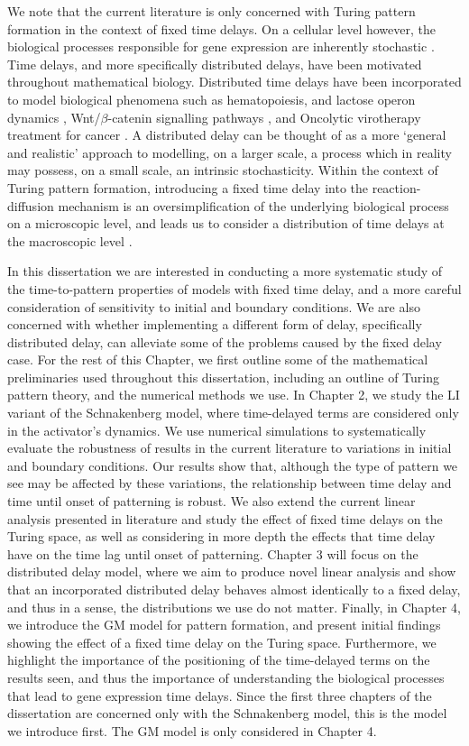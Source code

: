 We note that the current literature is only concerned with Turing pattern formation in the context of fixed time delays. On a cellular level however, the biological processes responsible for gene expression are inherently stochastic \cite{raj,elowitz,mcadams,paulsson}. Time delays, and more specifically distributed delays, have been motivated throughout mathematical biology. Distributed time delays have been incorporated to model biological phenomena such as hematopoiesis, and lactose operon dynamics \cite{newdist}, Wnt/$\beta$-catenin signalling pathways \cite{signal}, and Oncolytic virotherapy treatment for cancer \cite{cancer}. A distributed delay can be thought of as a more `general and realistic' \cite{cancer} approach to modelling, on a larger scale, a process which in reality may possess, on a small scale, an intrinsic stochasticity. Within the context of Turing pattern formation, introducing a fixed time delay into the reaction-diffusion mechanism is an oversimplification of the underlying biological process on a microscopic level, and leads us to consider a distribution of time delays at the macroscopic level \cite{bratsun,krausenew}.

In this dissertation we are interested in conducting a more systematic study of the time-to-pattern properties of models with fixed time delay, and a more careful consideration of sensitivity to initial and boundary conditions. We are also concerned with whether implementing a different form of delay, specifically distributed delay, can alleviate some of the problems caused by the fixed delay case. For the rest of this Chapter, we first outline some of the mathematical preliminaries used throughout this dissertation, including an outline of Turing pattern theory, and the numerical methods we use. In Chapter 2, we study the LI variant of the Schnakenberg model, where time-delayed terms are considered only in the activator's dynamics. We use numerical simulations to systematically evaluate the robustness of results in the current literature to variations in initial and boundary conditions. Our results show that, although the type of pattern we see may be affected by these variations, the relationship between time delay and time until onset of patterning is robust. We also extend the current linear analysis presented in literature and study the effect of fixed time delays on the Turing space, as well as considering in more depth the effects that time delay have on the time lag until onset of patterning. Chapter 3 will focus on the distributed delay model, where we aim to produce novel linear analysis and show that an incorporated distributed delay behaves almost identically to a fixed delay, and thus in a sense, the distributions we use do not matter. Finally, in Chapter 4, we introduce the GM model for pattern formation, and present initial findings showing the effect of a fixed time delay on the Turing space. Furthermore, we highlight the importance of the positioning of the time-delayed terms on the results seen, and thus the importance of understanding the biological processes that lead to gene expression time delays. Since the first three chapters of the dissertation are concerned only with the Schnakenberg model, this is the model we introduce first. The GM model is only considered in Chapter 4.

